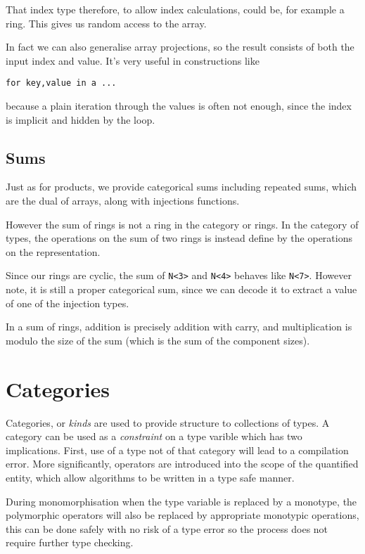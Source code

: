 \documentclass[oneside]{book}
\theoremstyle{plain}
\theoremstyle{definition}
\theoremstyle{plain}
\begin{document}
That index type therefore, to allow index calculations, could be,
for example a ring. This gives us random access to the array.
 
In fact we can also generalise array projections, so the result
consists of both the input index and value. It's very useful
in constructions like
\begin{verbatim}
for key,value in a ...
\end{verbatim}

because a plain iteration through the values is often not enough,
since the index is implicit and hidden by the loop.

\section{Sums}
Just as for products, we provide categorical sums including
repeated sums, which are the dual of arrays, along with 
injections functions.

However the sum of rings is not a ring in the category or rings.
In the category of types, the operations on the sum of two rings
is instead define by the operations on the representation.

Since our rings are cyclic, the sum of \verb$N<3>$ and \verb$N<4>$ behaves like
\verb$N<7>$. However note, it is still a proper categorical sum, since we
can decode it to extract a value of one of the injection types.

In a sum of rings, addition is precisely addition with carry,
and multiplication is modulo the size of the sum (which is the
sum of the component sizes).

\chapter{Categories}
Categories, or {\em kinds} are used to provide structure to collections of types.
A category can be used as a {\em constraint} on a type varible which has two
implications. First, use of a type not of that category will lead to a compilation
error. More significantly, operators are introduced into the scope of the quantified
entity, which allow algorithms to be written in a type safe manner.

During monomorphisation when the type variable is replaced by a monotype,
the polymorphic operators will also be replaced by appropriate monotypic
operations, this can be done safely with no risk of a type error so
the process does not require further type checking.
\end{document}
